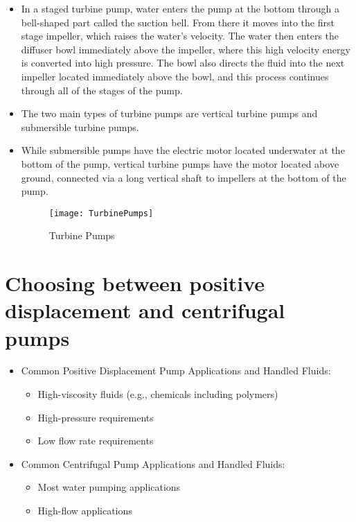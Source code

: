 \begin{itemize}
\item In a staged turbine pump, water enters the pump at the bottom through a bell-shaped part called the suction bell. From there it moves into the first stage impeller, which raises the water’s velocity. The water then enters the diffuser bowl immediately above the impeller, where this high velocity energy is converted into high pressure. The bowl also directs the fluid into the next impeller located immediately above the bowl, and this process continues through all of the stages of the pump. 

\item The two main types of turbine pumps are vertical turbine pumps and submersible turbine pumps.

\item While submersible pumps have the electric motor located underwater at the bottom of the pump, vertical turbine pumps have the motor located above ground, connected via a long vertical shaft to impellers at the bottom of the pump. 

\begin{figure}[h!]
\begin{center}
\texttt{[image: TurbinePumps]}
\caption{Turbine Pumps}
\end{center}
\end{figure}

\end{itemize}

\section{Choosing between positive displacement and centrifugal pumps}
\begin{itemize}
\item Common Positive Displacement Pump Applications and Handled Fluids:
\begin{itemize}
\item High-viscosity fluids (e.g., chemicals including polymers)
\item High-pressure requirements
\item Low flow rate requirements
\end{itemize}
\item Common Centrifugal Pump Applications and Handled Fluids:
\begin{itemize}
\item Most water pumping applications
\item High-flow applications
\end{itemize}
\end{itemize}

